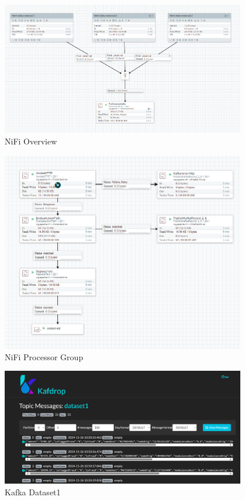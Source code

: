 \documentclass[12pt,a4paper, hidelinks]{article}
\begin{document}
\begin{figure}[htbp]
  \centering
  \includegraphics[width=0.95\textwidth]{images/m2-nifi-1.png}
  \caption{NiFi Overview}
  \label{fig:nifi-whole}
\end{figure}

\begin{figure}[htbp]
  \centering
  \includegraphics[width=0.95\textwidth]{images/m2-nifi-2.png}
  \caption{NiFi Processor Group}
  \label{fig:nifi-processor}
\end{figure}


\begin{figure}[htbp]
  \centering
  \includegraphics[width=0.95\textwidth]{images/m2-kafka-1.png}
  \caption{Kafka Dataset1}
  \label{fig:kafka1}
\end{figure}
\end{document}
